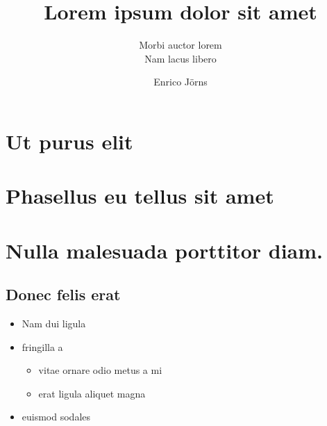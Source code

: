 \documentclass[a4paper,9pt,twoside,bcor=8mm]{tubsartcl}
\title{Lorem ipsum dolor sit amet}
\subtitle{Morbi auctor lorem\vphantom{g}\\ %
Nam lacus libero}
\author{Enrico Jörns}
\begin{document}
\maketitle[image]
\pagestyle{scrheadings}
\tableofcontents


\section{Ut purus elit}

\lipsum[1]

\section{Phasellus eu tellus sit amet}

\lipsum[2-5]

\section{Nulla malesuada porttitor diam.}

\lipsum[1-3]

\subsection{Donec felis erat}

\lipsum[4-7]

\begin{itemize}
  \item Nam dui ligula
  \item fringilla a
    \begin{itemize}
      \item vitae ornare odio metus a mi
      \item erat ligula aliquet magna
    \end{itemize}
  \item euismod sodales
\end{itemize}
\end{document}
